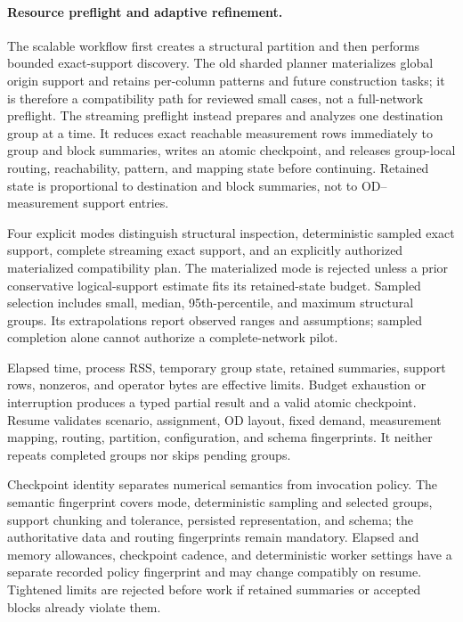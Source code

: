 \paragraph{Resource preflight and adaptive refinement.}
The scalable workflow first creates a structural partition and then performs
bounded exact-support discovery.  The old sharded planner materializes global
origin support and retains per-column patterns and future construction tasks;
it is therefore a compatibility path for reviewed small cases, not a
full-network preflight.  The streaming preflight instead prepares and analyzes
one destination group at a time.  It reduces exact reachable measurement rows
immediately to group and block summaries, writes an atomic checkpoint, and
releases group-local routing, reachability, pattern, and mapping state before
continuing.  Retained state is proportional to destination and block summaries,
not to OD--measurement support entries.

Four explicit modes distinguish structural inspection, deterministic sampled
exact support, complete streaming exact support, and an explicitly authorized
materialized compatibility plan.  The materialized mode is rejected unless a
prior conservative logical-support estimate fits its retained-state budget.
Sampled selection includes small, median, 95th-percentile, and maximum
structural groups.  Its extrapolations report observed ranges and assumptions;
sampled completion alone cannot authorize a complete-network pilot.

Elapsed time, process RSS, temporary group state, retained summaries, support
rows, nonzeros, and operator bytes are effective limits.  Budget exhaustion or
interruption produces a typed partial result and a valid atomic checkpoint.
Resume validates scenario, assignment, OD layout, fixed demand, measurement
mapping, routing, partition, configuration, and schema fingerprints.  It
neither repeats completed groups nor skips pending groups.

Checkpoint identity separates numerical semantics from invocation policy.
The semantic fingerprint covers mode, deterministic sampling and selected
groups, support chunking and tolerance, persisted representation, and schema;
the authoritative data and routing fingerprints remain mandatory.  Elapsed and
memory allowances, checkpoint cadence, and deterministic worker settings have
a separate recorded policy fingerprint and may change compatibly on resume.
Tightened limits are rejected before work if retained summaries or accepted
blocks already violate them.

